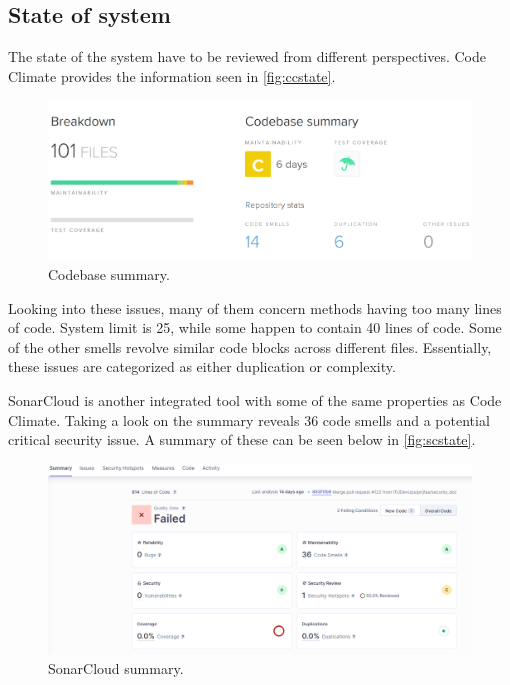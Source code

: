 \subsection{State of system}

The state of the system have to be reviewed from different perspectives. Code Climate provides the information seen in \autoref{fig:ccstate}.

\begin{figure}[H]
    \centering
    \includegraphics[width=\textwidth]{resources/CCstate.PNG}
    \caption{Codebase summary.}
    \label{fig:ccstate}
\end{figure}

Looking into these issues, many of them concern methods having too many lines of code. System limit is 25, while some happen to contain 40 lines of code. Some of the other smells revolve similar code blocks across different files. Essentially, these issues are categorized as either duplication or complexity.

SonarCloud is another integrated tool with some of the same properties as Code Climate. Taking a look on the summary reveals 36 code smells and a potential critical security issue. A summary of these can be seen below in \autoref{fig:scstate}.

\begin{figure}[H]
    \includegraphics[width=\textwidth]{resources/sonarcloud2.PNG}
    \caption{SonarCloud summary.}
    \label{fig:scstate}
\end{figure}

